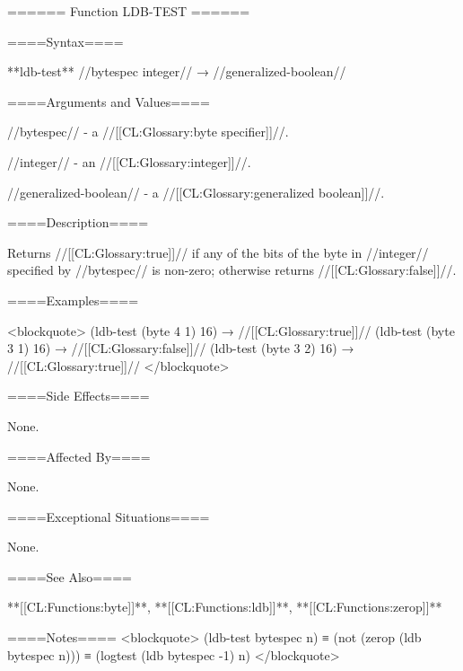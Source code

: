 ====== Function LDB-TEST ======

====Syntax====

**ldb-test** //bytespec integer// → //generalized-boolean//

====Arguments and Values====

//bytespec// - a //[[CL:Glossary:byte specifier]]//.

//integer// - an //[[CL:Glossary:integer]]//.

//generalized-boolean// - a //[[CL:Glossary:generalized boolean]]//.

====Description====

Returns //[[CL:Glossary:true]]// if any of the bits of the byte in //integer// specified by //bytespec// is non-zero; otherwise returns //[[CL:Glossary:false]]//.

====Examples====

<blockquote> (ldb-test (byte 4 1) 16) → //[[CL:Glossary:true]]// (ldb-test (byte 3 1) 16) → //[[CL:Glossary:false]]// (ldb-test (byte 3 2) 16) → //[[CL:Glossary:true]]// </blockquote>

====Side Effects====

None.

====Affected By====

None.

====Exceptional Situations====

None.

====See Also====

**[[CL:Functions:byte]]**, **[[CL:Functions:ldb]]**, **[[CL:Functions:zerop]]**

====Notes==== <blockquote> (ldb-test bytespec n) ≡ (not (zerop (ldb bytespec n))) ≡ (logtest (ldb bytespec -1) n) </blockquote>

